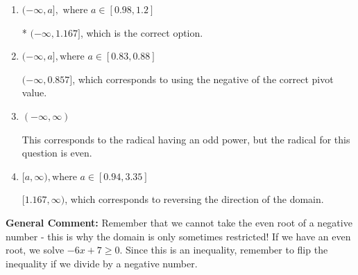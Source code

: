 \documentclass{extbook}[14pt]
\begin{document}
\begin{enumerate}
{\begin{enumerate}[label=\Alph*.]
$[0.857, \infty)$, which corresponds to reversing the direction of the domain AND using the negative of the correct pivot value.
\item \( (-\infty, a], \text{ where } a \in [0.98, 1.2] \)

* $(-\infty, 1.167]$, which is the correct option.
\item \( (-\infty, a], \text{where } a \in [0.83, 0.88] \)

$(-\infty, 0.857]$, which corresponds to using the negative of the correct pivot value.
\item \( (-\infty, \infty) \)

This corresponds to the radical having an odd power, but the radical for this question is even.
\item \( [a, \infty), \text{where } a \in [0.94, 3.35] \)

 $[1.167, \infty)$, which corresponds to reversing the direction of the domain.
\end{enumerate}

\textbf{General Comment:} Remember that we cannot take the even root of a negative number - this is why the domain is only sometimes restricted! If we have an even root, we solve $-6 x + 7 \geq 0$. Since this is an inequality, remember to flip the inequality if we divide by a negative number.
}
\end{enumerate}
\end{document}
